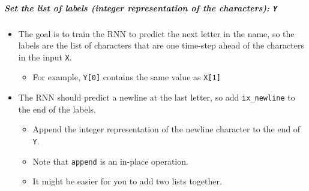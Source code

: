 \documentclass[11pt]{article}
\providecommand{\tightlist}{%
      \setlength{\itemsep}{0pt}\setlength{\parskip}{0pt}}
\begin{document}
    \hypertarget{set-the-list-of-labels-integer-representation-of-the-characters-y}{%
\subparagraph{\texorpdfstring{Set the list of labels (integer
representation of the characters):
\texttt{Y}}{Set the list of labels (integer representation of the characters): Y}}\label{set-the-list-of-labels-integer-representation-of-the-characters-y}}

\begin{itemize}
\tightlist
\item
  The goal is to train the RNN to predict the next letter in the name,
  so the labels are the list of characters that are one time-step ahead
  of the characters in the input \texttt{X}.

  \begin{itemize}
  \tightlist
  \item
    For example, \texttt{Y{[}0{]}} contains the same value as
    \texttt{X{[}1{]}}\\
  \end{itemize}
\item
  The RNN should predict a newline at the last letter, so add
  \texttt{ix\_newline} to the end of the labels.

  \begin{itemize}
  \tightlist
  \item
    Append the integer representation of the newline character to the
    end of \texttt{Y}.
  \item
    Note that \texttt{append} is an in-place operation.
  \item
    It might be easier for you to add two lists together.
  \end{itemize}
\end{itemize}
\end{document}
